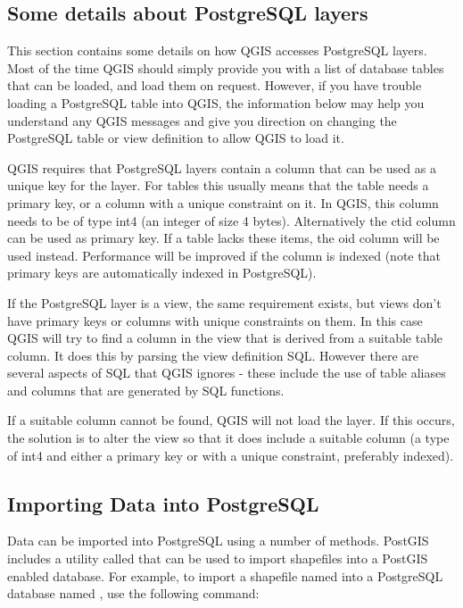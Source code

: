 \subsection{Some details about PostgreSQL
layers}\label{sec:postgis_details}

This section contains some details on how QGIS accesses PostgreSQL
layers. Most of the time QGIS should simply provide you with a list of
database tables that can be loaded, and load them on request. However,
if you have trouble loading a PostgreSQL table into QGIS, the information
below may help you understand any QGIS messages and give you direction on
changing the PostgreSQL table or view definition to allow QGIS to load it.

QGIS requires that PostgreSQL layers contain a column that can be
used as a unique key for the layer. For tables this usually means
that the table needs a primary key, or a column with a unique
constraint on it. In QGIS, this column needs to be of
type int4 (an integer of size 4 bytes). Alternatively the ctid column can be
used as primary key. If a table lacks these items,
the oid column will be used instead. Performance will be improved if the
column is indexed (note that primary keys are automatically indexed in
PostgreSQL). 

If the PostgreSQL layer is a view, the same requirement exists, but
views don't have primary keys or columns with unique constraints on
them. In this case QGIS will try to find a column in the view that is
derived from a suitable table column. It does this by parsing the view
definition SQL. However there are several aspects of SQL that QGIS ignores
- these include the use of table aliases and columns that are generated by
SQL functions.

If a suitable column cannot be found, QGIS will not load the layer. If this
occurs, the solution is to alter the view so that it does include a suitable
column (a type of int4 and either a primary key or with a unique constraint,
preferably indexed).


\subsection{Importing Data into PostgreSQL}\label{sec:loading_postgis_data}

Data can be imported into PostgreSQL using a number of methods. PostGIS
includes a utility called  that can be used to import shapefiles into
a PostGIS enabled database. For example, to import a shapefile named
into a PostgreSQL database named , use the following command:

